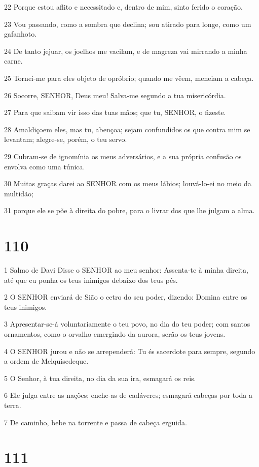 \par 22 Porque estou aflito e necessitado e, dentro de mim, sinto ferido o coração.
\par 23 Vou passando, como a sombra que declina; sou atirado para longe, como um gafanhoto.
\par 24 De tanto jejuar, os joelhos me vacilam, e de magreza vai mirrando a minha carne.
\par 25 Tornei-me para eles objeto de opróbrio; quando me vêem, meneiam a cabeça.
\par 26 Socorre, SENHOR, Deus meu! Salva-me segundo a tua misericórdia.
\par 27 Para que saibam vir isso das tuas mãos; que tu, SENHOR, o fizeste.
\par 28 Amaldiçoem eles, mas tu, abençoa; sejam confundidos os que contra mim se levantam; alegre-se, porém, o teu servo.
\par 29 Cubram-se de ignomínia os meus adversários, e a sua própria confusão os envolva como uma túnica.
\par 30 Muitas graças darei ao SENHOR com os meus lábios; louvá-lo-ei no meio da multidão;
\par 31 porque ele se põe à direita do pobre, para o livrar dos que lhe julgam a alma.

\chapter{110}

\par 1 Salmo de Davi Disse o SENHOR ao meu senhor: Assenta-te à minha direita, até que eu ponha os teus inimigos debaixo dos teus pés.
\par 2 O SENHOR enviará de Sião o cetro do seu poder, dizendo: Domina entre os teus inimigos.
\par 3 Apresentar-se-á voluntariamente o teu povo, no dia do teu poder; com santos ornamentos, como o orvalho emergindo da aurora, serão os teus jovens.
\par 4 O SENHOR jurou e não se arrependerá: Tu és sacerdote para sempre, segundo a ordem de Melquisedeque.
\par 5 O Senhor, à tua direita, no dia da sua ira, esmagará os reis.
\par 6 Ele julga entre as nações; enche-as de cadáveres; esmagará cabeças por toda a terra.
\par 7 De caminho, bebe na torrente e passa de cabeça erguida.

\chapter{111}

